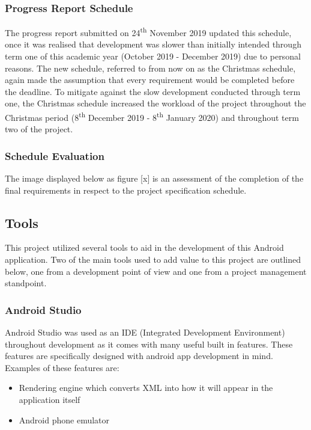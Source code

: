 \documentclass{article}
\begin{document}
\subsubsection{Progress Report Schedule}

The progress report submitted on 24\textsuperscript{th} November 2019 updated this schedule, once it was realised that development was slower than initially intended through term one of this academic year (October 2019 - December 2019) due to personal reasons. The new schedule, referred to from now on as the Christmas schedule, again made the assumption that every requirement would be completed before the deadline. To mitigate against the slow development conducted through term one, the Christmas schedule increased the workload of the project throughout the Christmas period (8\textsuperscript{th} December 2019 - 8\textsuperscript{th} January 2020) and throughout term two of the project. 

\subsubsection{Schedule Evaluation}

The image displayed below as figure [x] is an assessment of the completion of the final requirements in respect to the project specification schedule. 


\subsection{Tools}

This project utilized several tools to aid in the development of this Android application. Two of the main tools used to add value to this project are outlined below, one from a development point of view and one from a project management standpoint. 

\subsubsection{Android Studio}

Android Studio was used as an IDE (Integrated Development Environment) throughout development as it comes with many useful built in features. These features are specifically designed with android app development in mind. Examples of these features are: 

\begin{itemize}
	\item Rendering engine which converts XML into how it will appear in the application itself
	\item Android phone emulator
\end{itemize}
\end{document}
